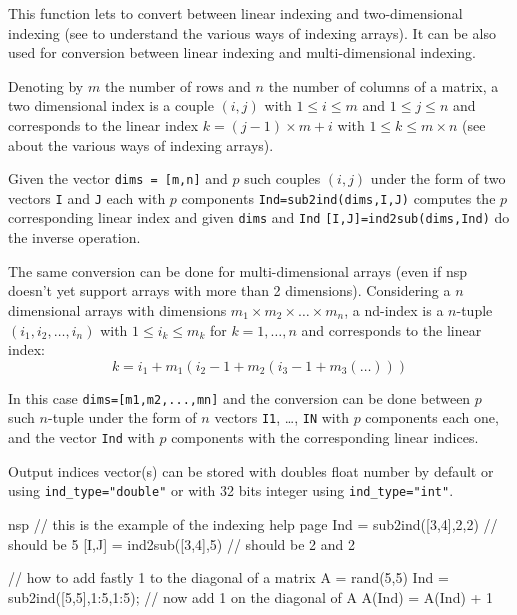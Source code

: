 \begin{mandescription}
This function lets to convert between linear indexing and two-dimensional indexing
(see  to understand the various
ways of indexing arrays). It can be also used for conversion between linear
indexing and multi-dimensional indexing. 


Denoting by $m$ the number of rows and $n$ the number of columns of a matrix, 
a two dimensional index is a couple $(i,j)$ with $1 \le i \le m$ and
$1 \le j \le n$ and corresponds to the linear index $k = (j-1) \times m + i$
with $1 \le k \le m \times n$ (see  
about the various ways of indexing arrays). 

Given the vector \verb+dims = [m,n]+ and $p$ such couples $(i,j)$ under the form 
of two vectors \verb+I+ and \verb+J+ each with $p$ components \verb+Ind=sub2ind(dims,I,J)+
computes the $p$ corresponding linear index and given \verb+dims+ and \verb+Ind+
\verb+[I,J]=ind2sub(dims,Ind)+ do the inverse operation.


The same conversion can be done for multi-dimensional arrays (even if nsp
doesn't yet support arrays with more than 2 dimensions). Considering a $n$
dimensional arrays with dimensions $m_1 \times m_2 \times \dots \times m_n$,
a nd-index is a $n$-tuple $(i_1,i_2,\dots, i_n)$ with $1 \le i_k \le m_k$
for $k=1,\dots,n$ and corresponds to the linear index:
$$
   k = i_1 + m_1 \left( i_2-1 + m_2 \left( i_3 - 1 + m_3 \left( \dots \right) \right) \right)  
$$ 

In this case \verb+dims=[m1,m2,...,mn]+ and the conversion can be done between $p$ such $n$-tuple
under the form of $n$ vectors \verb+I1+, \dots, \verb+IN+ with $p$ components each one, and 
the vector \verb+Ind+ with $p$ components with the corresponding linear indices.    


Output indices vector(s) can be stored with doubles float number by default or using \verb+ind_type="double"+
or with 32 bits integer using \verb+ind_type="int"+.

\end{mandescription}

\begin{examples}
\begin{mintednsp}{nsp}
// this is the example of the indexing help page
Ind = sub2ind([3,4],2,2)   // should be 5
[I,J] = ind2sub([3,4],5)   // should be 2 and 2

// how to add fastly 1 to the diagonal of a matrix
A = rand(5,5)
Ind = sub2ind([5,5],1:5,1:5);
// now add 1 on the diagonal of A
A(Ind) = A(Ind) + 1
\end{mintednsp}
\end{examples}


\begin{manseealso}
\end{manseealso}

